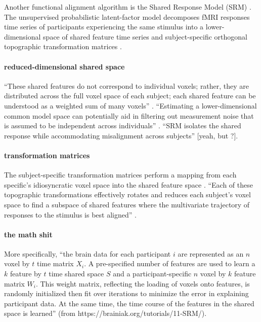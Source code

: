 Another functional alignment algorithm is the Shared Response Model (SRM)
\citep{chen2015reduced, richard2019fast}.
%
The unsupervised probabilistic latent-factor model decomposes fMRI responses
time series of participants experiencing the same stimulus into a
lower-dimensional space of shared feature time series and subject-specific
orthogonal topographic transformation matrices \citep{kumar2020brainiak,
cohen2017computational}.


\paragraph{reduced-dimensional shared space}
%
``These shared features do not correspond to individual voxels; rather, they are
distributed across the full voxel space of each subject; each shared feature can
be understood as a weighted sum of many voxels'' \citep{kumar2020brainiak}.
%
``Estimating a lower-dimensional common model space can potentially aid in
filtering out measurement noise that is assumed to be independent across
individuals'' \citep{chang2021endogenous}.
%
``SRM isolates the shared response while accommodating misalignment across
subjects'' \citep{kumar2020brainiak} [yeah, but \citep{nastase2019leveraging}?].


\paragraph{transformation matrices}
%
The subject-specific transformation matrices perform a mapping from each
specific's idiosyncratic voxel space into the shared feature space
\citep{kumar2020brainiak, cohen2017computational}.
%
``Each of these topographic transformations effectively rotates and reduces each
subject's voxel space to find a subspace of shared features where the
multivariate trajectory of responses to the stimulus is best aligned''
\citep{kumar2020brainiak}.


\paragraph{the math shit}
%
More specifically, ``the brain data for each participant $i$ are represented as
an \textbf{$n$} voxel by $t$ time matrix  $X_{i}$. A pre-specified number of
features are used to learn a $k$ feature by  $t$ time shared space $S$ and a
participant-specific $n$ voxel by $k$  feature matrix $W_{i}$. This weight
matrix, reflecting the loading of voxels onto features, is randomly initialized
then fit over iterations to minimize the error in explaining participant data.
At the same time, the time course of the features in the shared space is
learned'' (from https://brainiak.org/tutorials/11-SRM/).

